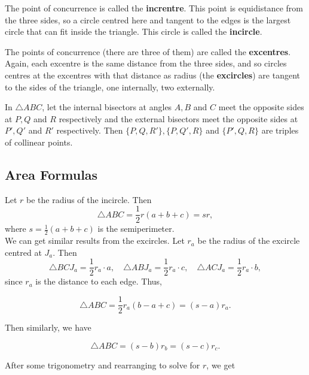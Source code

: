 
The point of concurrence is called the \textbf{increntre}. This point is equidistance from the three sides, so a circle centred here and tangent to the edges is the largest circle that can fit inside the triangle. This circle is called the \textbf{incircle}.


The points of concurrence (there are three of them) are called the \textbf{excentres}. Again, each excentre is the same distance from the three sides, and so circles centres at the excentres with that distance as radius (the \textbf{excircles}) are tangent to the sides of the triangle, one internally, two externally.


\begin{theorem}
    In \(\triangle ABC\), let the internal bisectors at angles \(A, B\) and \(C\) meet the opposite sides at \(P, Q\) and \(R\) respectively and the external bisectors meet the opposite sides at \(P', Q'\) and \(R'\) respectively. Then \(\{P, Q, R'\}, \{P, Q', R\}\) and \(\{P', Q, R\}\) are triples of collinear points.
\end{theorem}

\subsection{Area Formulas}

Let \(r\) be the radius of the incircle. Then
\[\triangle ABC = \frac{1}{2}r(a + b + c) = sr,\]
where \(s = \frac{1}{2}(a + b + c)\) is the semiperimeter. \\

We can get similar results from the excircles. Let \(r_a\) be the radius of the excircle centred at \(J_a\). Then
\[\triangle BCJ_a = \frac{1}{2}r_a \cdot a, \quad \triangle ABJ_a = \frac{1}{2}r_a \cdot c, \quad \triangle ACJ_a = \frac{1}{2}r_a \cdot b,\]
since \(r_a\) is the distance to each edge. Thus,

\[\triangle ABC = \frac{1}{2}r_a(b - a + c) = (s - a)r_a.\]

Then similarly, we have

\[\triangle ABC = (s - b)r_b = (s - c)r_c.\]

After some trigonometry and rearranging to solve for \(r\), we get


